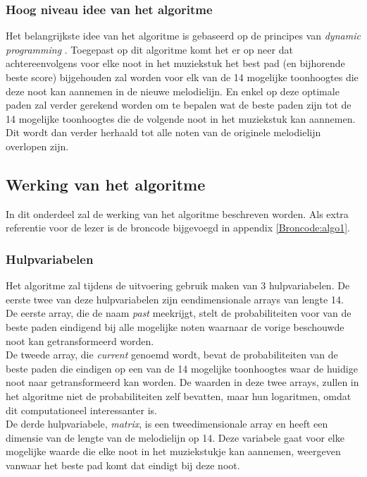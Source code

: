 \subsubsection{Hoog niveau idee van het algoritme}
Het belangrijkste idee van het algoritme is gebaseerd op de principes van \textit{dynamic programming} \cite{url:DP}. Toegepast op dit algoritme komt het er op neer dat achtereenvolgens voor elke noot in het muziekstuk het best pad (en bijhorende beste score) bijgehouden zal worden voor elk van de 14 mogelijke toonhoogtes die deze noot kan aannemen in de nieuwe melodielijn. En enkel op deze optimale paden zal verder gerekend worden om te bepalen wat de beste paden zijn tot de 14 mogelijke toonhoogtes die de volgende noot in het muziekstuk kan aannemen. Dit wordt dan verder herhaald tot alle noten van de originele melodielijn overlopen zijn.

\subsection{Werking van het algoritme}
In dit onderdeel zal de werking van het algoritme beschreven worden. Als extra referentie voor de lezer is de broncode bijgevoegd in appendix \ref{Broncode:algo1}.

\subsubsection{Hulpvariabelen}
Het algoritme zal tijdens de uitvoering gebruik maken van 3 hulpvariabelen. De eerste twee van deze hulpvariabelen zijn eendimensionale arrays van lengte 14.\\
De eerste array, die de naam \textit{past} meekrijgt, stelt de probabiliteiten voor van de beste paden eindigend bij alle mogelijke noten waarnaar de vorige beschouwde noot kan getransformeerd worden.\\ 
De tweede array, die \textit{current} genoemd wordt, bevat de probabiliteiten van de beste paden die eindigen op een van de 14 mogelijke toonhoogtes waar de huidige noot naar getransformeerd kan worden. De waarden in deze twee arrays, zullen in het algoritme niet de probabiliteiten zelf bevatten, maar hun logaritmen, omdat dit computationeel interessanter is.\\ 
De derde hulpvariabele, \textit{matrix}, is een tweedimensionale array en heeft een dimensie van de lengte van de melodielijn op 14. Deze variabele gaat voor elke mogelijke waarde die elke noot in het muziekstukje kan aannemen, weergeven vanwaar het beste pad komt dat eindigt bij deze noot.

